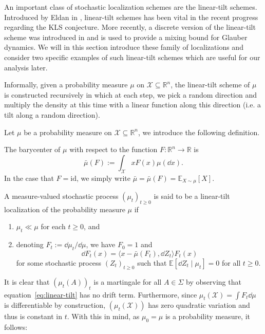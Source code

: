 An important class of stochastic localization schemes are the linear-tilt schemes. Introduced by Eldan 
in \cite{Eldan_2013}, linear-tilt schemes has been vital in the recent progress regarding the KLS 
conjecture. More recently, a discrete version of the linear-tilt scheme was introduced in \cite{Chen_2022}
and is used to provide a mixing bound for Glauber dynamics. We will in this section introduce these family 
of localizations and consider two specific examples of such linear-tilt schemes which are 
useful for our analysis later.

Informally, given a probability measure \(\mu\) on \(\mathcal{X} \subseteq \mathbb{R}^n\), the linear-tilt scheme
of \(\mu\) is constructed recursively in which at each step, we pick a random direction and multiply 
the density at this time with a linear function along this direction (i.e. a tilt along a random 
direction). 

Let \(\mu\) be a probability measure on \(\mathcal{X} \subseteq \mathbb{R}^n\), we introduce the following definition.
\begin{definition}[Barycenter]
  The barycenter of \(\mu\) with respect to the function \(F : \mathbb{R}^n \to \mathbb{R}\) is
  \[\bar{\mu}(F) := \int_{\mathcal{X}} x F(x) \mu(\dd x).\]
  In the case that \(F = \text{id}\), we simply write \(\bar{\mu} = \bar{\mu}(F) = \mathbb{E}_{X \sim \mu}[X]\).
\end{definition}

\begin{definition}
  A measure-valued stochastic process \((\mu_t)_{t \ge 0}\) is said to be a linear-tilt localization of
  the probability measure \(\mu\) if 
  \begin{enumerate}
    \item \(\mu_t \ll \mu\) for each \(t \ge 0\), and 
    \item denoting \(F_t := \dd \mu_t / \dd \mu\), we have \(F_0 = 1\) and 
      \begin{equation}\label{eq:linear-tilt}
        \dd F_t(x) = \langle x - \bar{\mu}(F_t), \dd Z_t \rangle F_t(x)
      \end{equation}
      for some stochastic process \((Z_t)_{t \ge 0}\) such that \(\mathbb{E}[\dd Z_t \mid \mu_t] = 0\) 
      for all \(t \ge 0\). 
  \end{enumerate} 
\end{definition}

It is clear that \((\mu_t(A))_t\) is a martingale for all \(A \in \Sigma\) by observing that 
equation~\eqref{eq:linear-tilt} has no drift term. Furthermore, since \(\mu_t(\mathcal{X}) = \int F_t \dd \mu\) is differentiable by 
construction, \((\mu_t(\mathcal{X}))\) has zero quadratic variation and thus is constant in \(t\). 
With this in mind, as \(\mu_0 = \mu\) is a probability measure, it follows:


